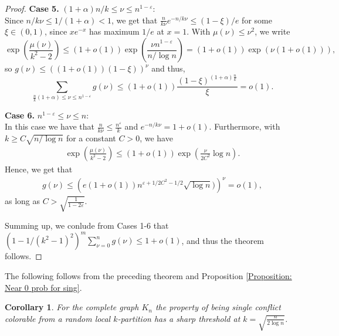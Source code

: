 \documentclass[12pt]{article}
\newtheorem{corollary}[theorem]{Corollary}
\newcommand{\1}{\mathds{1}}
\begin{document}
\begin{proof}
    \vspace{\baselineskip}

    \textbf{Case 5.} $(1+\alpha)n/k \le \nu \le n^{1-\varepsilon}$: \hfill \\
    Since $n/k\nu \leq 1/(1+\alpha)<1$, we get that
    $\frac{n}{k\nu}e^{-n/k\nu}\leq (1-\xi)/e$ for some $\xi\in(0,1)$, since $xe^{-x}$ has maximum $1/e$ at $x=1$. With $\mu(\nu)\leq \nu^2$, we write
    $$
    \exp\left(\frac{\mu(\nu)}{k^2-2}\right)\leq (1+o(1))\exp\left(\frac{\nu n^{1-\varepsilon}}{n/\log n}\right)
=(1+o(1))\exp\left(\nu (1+o(1))\right),
    $$
    so $g(\nu)\le \left((1+o(1))(1-\xi)\right)^\nu$ and thus, 
    $$
    \sum_{\frac{n}{k}(1+\alpha)\le \nu \le n^{1-\varepsilon}} g(\nu) \le (1+o(1))\frac{(1-\xi)^{(1+\alpha)\frac{n}{k}}}{\xi}=o(1).
    $$

    \vspace{\baselineskip}

    \textbf{Case 6.} $n^{1-\varepsilon}\le \nu \le n$: \hfill \\
 In this case we have that $\frac{n}{k\nu}\leq \frac{n^{\varepsilon}}{k}$ and 
$e^{-n/k\nu} %
=1+o(1)$. Furthermore, with $k\geq C\sqrt{n/\log n}$ for a constant $C>0$, we have
    \begin{align*}
        \exp\left(\frac{\mu(\nu)}{k^2-2}\right)%
        \le(1+o(1))\exp\left(\frac{\nu}{2C^2}\log n\right).
    \end{align*}
    Hence, we get that
    \begin{align*}
        g(\nu)\le \left(e(1+o(1))n^{\varepsilon+1/2C^2-1/2}\sqrt{\log n}) \right)^{\nu} =o(1),
    \end{align*}
    as long as 
    $
    C>\sqrt{\frac{1}{1-2\varepsilon}}
    $. 

\bigskip

Summing up, we conlude from Cases 1-6 that $(1-1/(k^2-1)^2)^{m}\sum_{\nu=0}^ng(\nu)\leq 1+o(1)$,
and thus the theorem follows.
\end{proof}

The following follows from the preceding theorem and Proposition \ref{Proposition: Near 0 prob for sing}.

\begin{corollary}
	\label{cor:complete}
	For the complete graph $K_n$ the property of being single conflict colorable from a 
	random local $k$-partition has a sharp threshold at $k =\sqrt{\frac {n}{2 \log n}}$.
\end{corollary}
\end{document}

